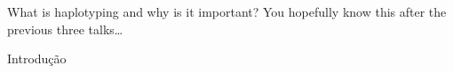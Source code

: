 \documentclass{beamer}
\begin{document}
\begin{frame}{What is haplotyping and why is it important?}
  You hopefully know this after the previous three talks\dots
\end{frame}


  \begin{frame}{Introdução}
\end{frame}
\end{document}
